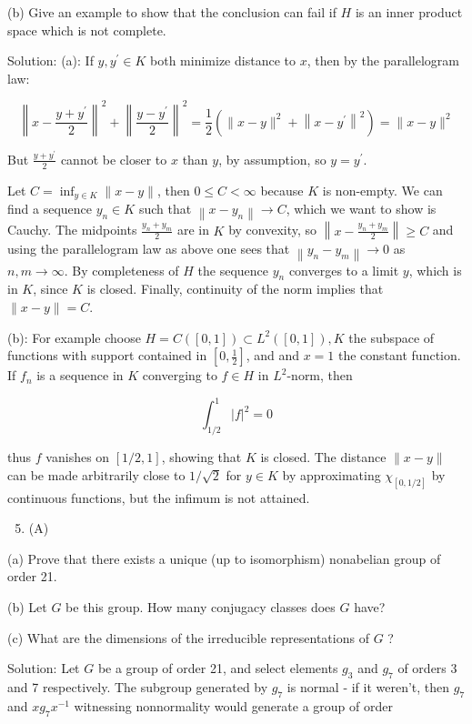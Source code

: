 \documentclass[10pt]{article}
\begin{document}
(b) Give an example to show that the conclusion can fail if $H$ is an inner product space which is not complete.

Solution: (a): If $y, y^{\prime} \in K$ both minimize distance to $x$, then by the parallelogram law:

$$
\left\|x-\frac{y+y^{\prime}}{2}\right\|^{2}+\left\|\frac{y-y^{\prime}}{2}\right\|^{2}=\frac{1}{2}\left(\|x-y\|^{2}+\left\|x-y^{\prime}\right\|^{2}\right)=\|x-y\|^{2}
$$

But $\frac{y+y^{\prime}}{2}$ cannot be closer to $x$ than $y$, by assumption, so $y=y^{\prime}$.

Let $C=\inf _{y \in K}\|x-y\|$, then $0 \leq C<\infty$ because $K$ is non-empty. We can find a sequence $y_{n} \in K$ such that $\left\|x-y_{n}\right\| \rightarrow C$, which we want to show is Cauchy. The midpoints $\frac{y_{n}+y_{m}}{2}$ are in $K$ by convexity, so $\left\|x-\frac{y_{n}+y_{m}}{2}\right\| \geq C$ and using the parallelogram law as above one sees that $\left\|y_{n}-y_{m}\right\| \rightarrow 0$ as $n, m \rightarrow \infty$. By completeness of $H$ the sequence $y_{n}$ converges to a limit $y$, which is in $K$, since $K$ is closed. Finally, continuity of the norm implies that $\|x-y\|=C$.

(b): For example choose $H=C([0,1]) \subset L^{2}([0,1]), K$ the subspace of functions with support contained in $\left[0, \frac{1}{2}\right]$, and and $x=1$ the constant function. If $f_{n}$ is a sequence in $K$ converging to $f \in H$ in $L^{2}$-norm, then

$$
\int_{1 / 2}^{1}|f|^{2}=0
$$

thus $f$ vanishes on $[1 / 2,1]$, showing that $K$ is closed. The distance $\|x-y\|$ can be made arbitrarily close to $1 / \sqrt{2}$ for $y \in K$ by approximating $\chi_{[0,1 / 2]}$ by continuous functions, but the infimum is not attained.

\begin{enumerate}
  \setcounter{enumi}{4}
  \item (A)
\end{enumerate}

(a) Prove that there exists a unique (up to isomorphism) nonabelian group of order 21.

(b) Let $G$ be this group. How many conjugacy classes does $G$ have?

(c) What are the dimensions of the irreducible representations of $G$ ?

Solution: Let $G$ be a group of order 21, and select elements $g_{3}$ and $g_{7}$ of orders 3 and 7 respectively. The subgroup generated by $g_{7}$ is normal - if it weren't, then $g_{7}$ and $x g_{7} x^{-1}$ witnessing nonnormality would generate a group of order
\end{document}
